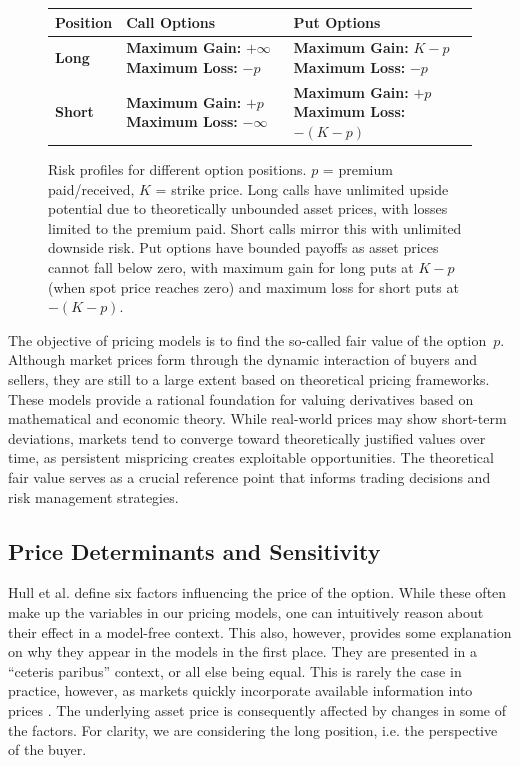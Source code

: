 \documentclass[english,12pt,a4paper,pdftex,sci,utf8]{aaltothesis}
\begin{document}
\begin{figure}[htbp]
\centering
\label{options-risk-table}
\begin{tabular}{|l|p{5cm}|p{5cm}|}
\hline
\textbf{Position} & \textbf{Call Options} & \textbf{Put Options} \\
\hline
\textbf{Long} & \textbf{Maximum Gain:} $+\infty$
\newline \textbf{Maximum Loss:} $-p$ & \textbf{Maximum Gain:} $K-p$
\newline \textbf{Maximum Loss:} $-p$ \\
\hline
\textbf{Short} & \textbf{Maximum Gain:} $+p$
\newline \textbf{Maximum Loss:} $-\infty$ & \textbf{Maximum Gain:} $+p$
\newline \textbf{Maximum Loss:} $-(K-p)$ \\
\hline
\end{tabular}
\caption{Risk profiles for different option positions. $p$ = premium paid/received, $K$ = strike price. Long calls have unlimited upside potential due to theoretically unbounded asset prices, with losses limited to the premium paid. Short calls mirror this with unlimited downside risk. Put options have bounded payoffs as asset prices cannot fall below zero, with maximum gain for long puts at $K-p$ (when spot price reaches zero) and maximum loss for short puts at $-(K-p)$.}\label{fig:optiontable}
\end{figure}

The objective of pricing models is to find the so-called fair value of the option~$p$. Although market prices form through the dynamic interaction of buyers and sellers, they are still to a large extent based on theoretical pricing frameworks. These models provide a rational foundation for valuing derivatives based on mathematical and economic theory. While real-world prices may show short-term deviations, markets tend to converge toward theoretically justified values over time, as persistent mispricing creates exploitable opportunities. The theoretical fair value serves as a crucial reference point that informs trading decisions and risk management strategies.


\subsection{Price Determinants and Sensitivity}

Hull et al. \cite{hull2013fundamentals} define six factors influencing the price of the option. While these often make up the variables in our pricing models, one can intuitively reason about their effect in a model-free context. This also, however, provides some explanation on why they appear in the models in the first place. They are presented in a ``ceteris paribus'' context, or all else being equal. This is rarely the case in practice, however, as markets quickly incorporate available information into prices \cite{fama1970efficient}. The underlying asset price is consequently affected by changes in some of the factors. For clarity, we are considering the long position, i.e. the perspective of the buyer.
\end{document}
